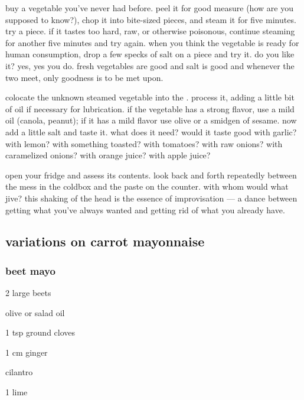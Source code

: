 \begin{algorithm}
  \item buy a vegetable you've never had before. peel it for good measure (how 
  are you supposed to know?), chop it into bite-sized pieces, and steam it for 
  five minutes. try a piece. if it tastes too hard, raw, or otherwise 
  poisonous, continue steaming for another five minutes and try again. when 
  you think the vegetable is ready for human consumption, drop a few specks of 
  salt on a piece and try it. do you like it? yes, yes you do. fresh 
  vegetables are good and salt is good and whenever the two meet, only 
  goodness is to be met upon.

  \item colocate the unknown steamed vegetable into the . process it, 
  adding a little bit of oil if necessary for lubrication. if the vegetable 
  has a strong flavor, use a mild oil (canola, peanut); if it has a mild 
  flavor use olive  or a smidgen of sesame. now add a little salt and taste 
  it. what does it need? would it taste good with garlic? with lemon? with 
  something toasted? with tomatoes? with raw onions? with caramelized onions? 
  with orange juice? with apple juice?

  \item open your fridge and assess its contents. look back and forth 
  repeatedly between the mess in the coldbox and the paste on the counter. 
  with whom would what jive? this shaking of the head is the essence of 
  improvisation --- a dance between getting what you've always wanted and 
  getting rid of what you already have.

\end{algorithm}

\subsection{variations on carrot mayonnaise}

\subsubsection{beet mayo}

\begin{ingredients}
  \item 2 large beets
  \item olive or salad oil
  \item 1 tsp ground cloves
  \item 1 cm ginger
  \item cilantro
  \item 1 lime
\end{ingredients}

